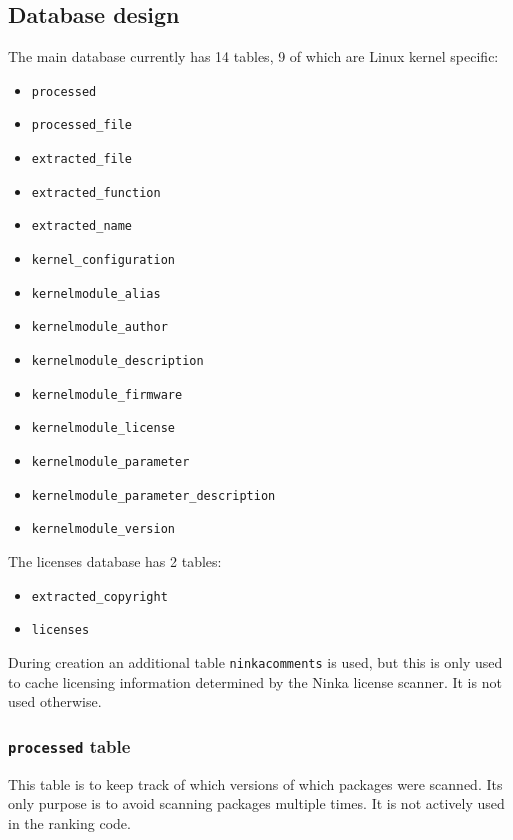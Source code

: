 \documentclass[10pt]{article}
\begin{document}
\subsection{Database design}

The main database currently has 14 tables, 9 of which are Linux kernel specific:

\begin{itemize}
\item \texttt{processed}
\item \texttt{processed\_file}
\item \texttt{extracted\_file}
\item \texttt{extracted\_function}
\item \texttt{extracted\_name}
\item \texttt{kernel\_configuration}
\item \texttt{kernelmodule\_alias}
\item \texttt{kernelmodule\_author}
\item \texttt{kernelmodule\_description}
\item \texttt{kernelmodule\_firmware}
\item \texttt{kernelmodule\_license}
\item \texttt{kernelmodule\_parameter}
\item \texttt{kernelmodule\_parameter\_description}
\item \texttt{kernelmodule\_version}
\end{itemize}

The licenses database has 2 tables:

\begin{itemize}
\item \texttt{extracted\_copyright}
\item \texttt{licenses}
\end{itemize}

During creation an additional table \texttt{ninkacomments} is used, but this
is only used to cache licensing information determined by the Ninka license
scanner. It is not used otherwise.

\subsubsection{\texttt{processed} table}

This table is to keep track of which versions of which packages were scanned.
Its only purpose is to avoid scanning packages multiple times. It is not
actively used in the ranking code.
\end{document}
